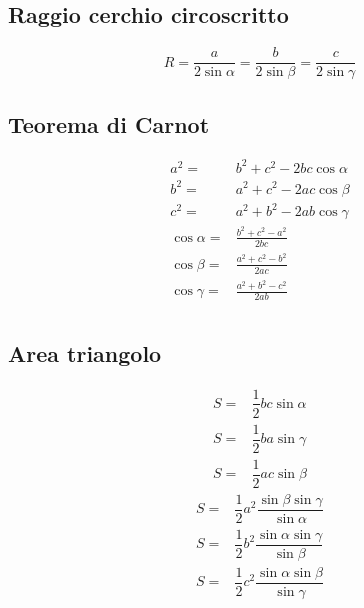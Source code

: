 \subsection{Raggio cerchio circoscritto}
\begin{equation*}
R=\dfrac{a}{2\sin\alpha}=\dfrac{b}{2\sin\beta}=\dfrac{c}{2\sin\gamma}
\end{equation*}
\subsection{Teorema di Carnot}
\begin{align*}
a^2=&b^2+c^2-2bc\cos\alpha\\
b^2=&a^2+c^2-2ac\cos\beta\\
c^2=&a^2+b^2-2ab\cos\gamma\\
\cos\alpha=&\frac{b^2+c^2-a^2}{2bc}\\
\cos\beta=&\frac{a^2+c^2-b^2}{2ac}\\
\cos\gamma=&\frac{a^2+b^2-c^2}{2ab}\\
\end{align*}
\subsection{Area triangolo}
\begin{align*}
S=&\dfrac{1}{2}bc\sin\alpha\\
S=&\dfrac{1}{2}ba\sin\gamma\\
S=&\dfrac{1}{2}ac\sin\beta
\end{align*}
\begin{align*}
S=&\dfrac{1}{2}a^2\dfrac{\sin\beta\sin\gamma}{\sin\alpha}\\
S=&\dfrac{1}{2}b^2\dfrac{\sin\alpha\sin\gamma}{\sin\beta}\\
S=&\dfrac{1}{2}c^2\dfrac{\sin\alpha\sin\beta}{\sin\gamma}
\end{align*}